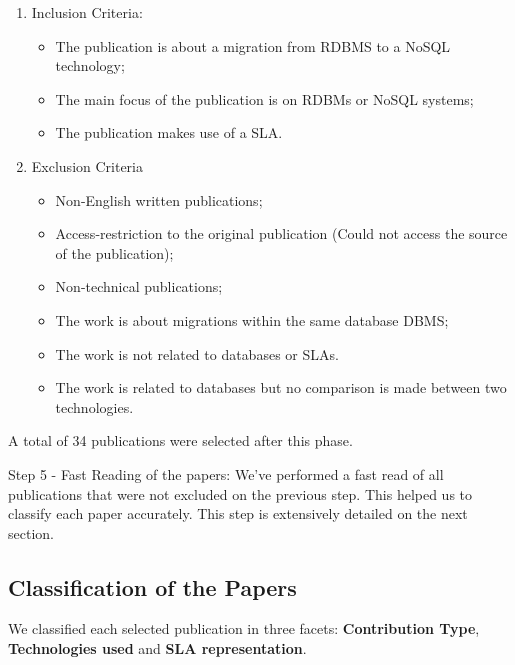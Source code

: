 \documentclass{article}
\begin{document}
\begin{enumerate}
    \item Inclusion Criteria: 
    \begin{itemize}
      \item The publication is about a migration from RDBMS to a NoSQL technology;
      \item The main focus of the publication is on RDBMs or NoSQL systems;
      \item The publication makes use of a SLA.
    \end{itemize}
    \item Exclusion Criteria
	\begin{itemize}
    \item Non-English written publications;
		\item Access-restriction to the original publication (Could not access the source of the publication);
		\item Non-technical publications;
    \item The work is about migrations within the same database DBMS;
    \item The work is not related to databases or SLAs.
    \item The work is related to databases but no comparison is made between two technologies.
    \end{itemize}
    
\end{enumerate}
A total of 34 publications were selected after this phase. 

Step 5 - Fast Reading of the papers: We've performed a fast read of all publications that were not excluded on the previous step. This helped us to classify each paper accurately. This step is extensively detailed on the next section. 


\subsection{Classification of the Papers}

We classified each selected publication in three facets: \textbf{Contribution Type}, \textbf{Technologies used} and \textbf{SLA representation}. 
\end{document}
